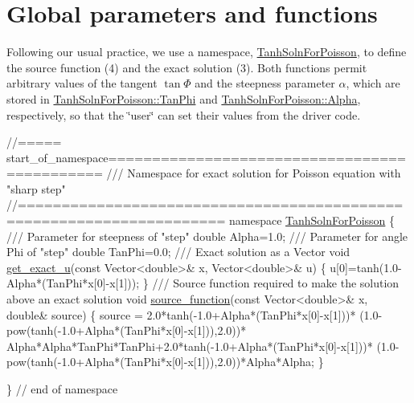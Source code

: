  

\hypertarget{index_global}{}\section{Global parameters and functions}\label{index_global}
Following our usual practice, we use a namespace, {\ttfamily \hyperlink{namespaceTanhSolnForPoisson}{Tanh\+Soln\+For\+Poisson}}, to define the source function (4) and the exact solution (3). Both functions permit arbitrary values of the tangent $ \tan \Phi $ and the steepness parameter $ \alpha $, which are stored in \hyperlink{namespaceTanhSolnForPoisson_a785ccd00a727125a5138fbbcac173294}{Tanh\+Soln\+For\+Poisson\+::\+Tan\+Phi} and \hyperlink{namespaceTanhSolnForPoisson_ae676ccd186d5df119cce811596d949c1}{Tanh\+Soln\+For\+Poisson\+::\+Alpha}, respectively, so that the \char`\"{}user\char`\"{} can set their values from the driver code.

 
\begin{DoxyCodeInclude}
\textcolor{comment}{//===== start\_of\_namespace=============================================}
\textcolor{comment}{/// Namespace for exact solution for Poisson equation with "sharp step" }
\textcolor{comment}{}\textcolor{comment}{//=====================================================================}
\textcolor{keyword}{namespace }\hyperlink{namespaceTanhSolnForPoisson}{TanhSolnForPoisson}
\{
\textcolor{comment}{}
\textcolor{comment}{ /// Parameter for steepness of "step"}
\textcolor{comment}{} \textcolor{keywordtype}{double} Alpha=1.0;
\textcolor{comment}{}
\textcolor{comment}{ /// Parameter for angle Phi of "step"}
\textcolor{comment}{} \textcolor{keywordtype}{double} TanPhi=0.0;
\textcolor{comment}{}
\textcolor{comment}{ /// Exact solution as a Vector}
\textcolor{comment}{} \textcolor{keywordtype}{void} \hyperlink{namespaceTanhSolnForPoisson_af7896e9c18ce6438c73ae2a875e8b7de}{get\_exact\_u}(\textcolor{keyword}{const} Vector<double>& x, Vector<double>& u)
 \{
  u[0]=tanh(1.0-Alpha*(TanPhi*x[0]-x[1]));
 \}
\textcolor{comment}{}
\textcolor{comment}{ /// Source function required to make the solution above an exact solution }
\textcolor{comment}{} \textcolor{keywordtype}{void} \hyperlink{namespaceTanhSolnForPoisson_a967bc28320e02534beb714846b63e251}{source\_function}(\textcolor{keyword}{const} Vector<double>& x, \textcolor{keywordtype}{double}& source)
 \{
  source = 2.0*tanh(-1.0+Alpha*(TanPhi*x[0]-x[1]))*
   (1.0-pow(tanh(-1.0+Alpha*(TanPhi*x[0]-x[1])),2.0))*
   Alpha*Alpha*TanPhi*TanPhi+2.0*tanh(-1.0+Alpha*(TanPhi*x[0]-x[1]))*
   (1.0-pow(tanh(-1.0+Alpha*(TanPhi*x[0]-x[1])),2.0))*Alpha*Alpha;
 \}
 
\} \textcolor{comment}{// end of namespace}

\end{DoxyCodeInclude}




